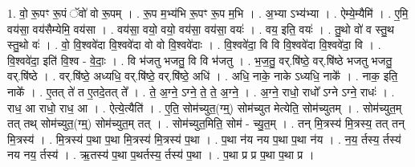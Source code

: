 \documentclass[17pt]{extarticle}
\begin{document}
1. वो॒ रू॒पꣳ रू॒पं ॅवो॑ वो रू॒पम् । . रू॒प म॒भ्य॑भि रू॒पꣳ रू॒प म॒भि । . अ॒भ्या ऽभ्य॑भ्या । . ऐम्ये॒म्यैमि॑ । . ए॒मि॒ वय॑सा॒ वय॑सैम्येमि॒ वय॑सा । . वय॑सा॒ वयो॒ वयो॒ वय॑सा॒ वय॑सा॒ वयः॑ । . वय॒ इति॒ वयः॑ । . तु॒थो वो॑ व स्तु॒थ स्तु॒थो वः॑ । . वो॒ वि॒श्ववे॑दा वि॒श्ववे॑दा वो वो वि॒श्ववे॑दाः । . वि॒श्ववे॑दा॒ वि वि वि॒श्ववे॑दा वि॒श्ववे॑दा॒ वि । . वि॒श्ववे॑दा॒ इति॑ वि॒श्व - वे॒दाः॒ । . वि भ॑जतु भजतु॒ वि वि भ॑जतु । . भ॒ज॒तु॒ वर्.षि॑ष्ठे॒ वर्.षि॑ष्ठे भजतु भजतु॒ वर्.षि॑ष्ठे । . वर्.षि॑ष्ठे॒ अध्यधि॒ वर्.षि॑ष्ठे॒ वर्.षि॑ष्ठे॒ अधि॑ । . अधि॒ नाके॒ नाके ऽध्यधि॒ नाके᳚ । . नाक॒ इति॒ नाके᳚ । . ए॒तत् ते॑ त ए॒तदे॒तत् ते᳚ । . ते॒ अ॒ग्ने॒ ऽग्ने॒ ते॒ ते॒ अ॒ग्ने॒ । . अ॒ग्ने॒ राधो॒ राधो᳚ ऽग्ने ऽग्ने॒ राधः॑ । . राध॒ आ राधो॒ राध॒ आ । . ऐत्ये॒त्यैति॑ । . ए॒ति॒ सोम॑च्युत॒(ग्म्॒) सोम॑च्युत मेत्येति॒ सोम॑च्युतम् । . सोम॑च्युत॒म् तत् तथ् सोम॑च्युत॒(ग्म्॒) सोम॑च्युत॒म् तत् । . सोम॑च्युत॒मिति॒ सोम॑ - च्यु॒त॒म् । . तन् मि॒त्रस्य॑ मि॒त्रस्य॒ तत् तन् मि॒त्रस्य॑ । . मि॒त्रस्य॑ प॒था प॒था मि॒त्रस्य॑ मि॒त्रस्य॑ प॒था । . प॒था न॑य नय प॒था प॒था न॑य । . न॒य॒ र्तस्य॒ र्तस्य॑ नय नय॒ र्तस्य॑ । . ऋ॒तस्य॑ प॒था प॒थर्तस्य॒ र्तस्य॑ प॒था । . प॒था प्र प्र प॒था प॒था प्र । \newline
\end{document}
